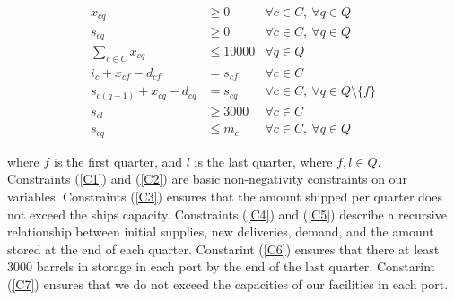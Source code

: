 \documentclass[a4paper]{article}
\begin{document}
\begin{align}
x_{cq} & \geq 0 & \forall c \in C,\  \forall q \in Q \label{C1}\\
s_{cq} & \geq 0 & \forall c \in C,\  \forall q \in Q \label{C2}\\
\sum_{c \in C} x_{cq} & \leq 10000 & \forall q \in Q \label{C3}\\
i_{c} +  x_{cf} - d_{cf} & = s_{cf} & \forall c \in C \label{C4}\\
s_{c(q - 1)} +  x_{cq} - d_{cq} & = s_{cq} & \forall c \in C,\  \forall q \in Q \setminus \{ f \} \label{C5}\\
s_{cl} & \geq 3000 & \forall c \in C \label{C6}\\
s_{cq} & \leq m_c & \forall c \in C,\  \forall q \in Q \label{C7}
\end{align}

where $f$ is the first quarter, and $l$ is the last quarter, where $f, l \in Q$.\\

Constraints (\ref{C1}) and (\ref{C2}) are basic non-negativity constraints on our variables. 
Constraints (\ref{C3}) ensures that the amount shipped per quarter does not exceed the ships capacity.
Constraints (\ref{C4}) and (\ref{C5}) describe a recursive relationship between initial supplies, new deliveries, demand, and the amount stored at the end of each quarter.
Constarint (\ref{C6}) ensures that there at least 3000 barrels in storage in each port by the end of the last quarter.
Constarint (\ref{C7}) ensures that we do not exceed the capacities of our facilities in each port.
\end{document}
